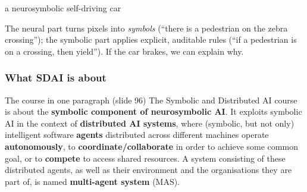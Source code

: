\begin{nbexample}{a neurosymbolic self-driving car}
\notinslides
\begin{center}
\end{center}
The neural part turns pixels into \emph{symbols} (``there is a pedestrian on the zebra
crossing''); the symbolic part applies explicit, auditable rules
(``if a pedestrian is on a crossing, then yield''). If the car brakes, we can explain why.
\end{nbexample}

\subsubsection{What SDAI is about}

\begin{nbfact}{The course in one paragraph (slide 96)}
The Symbolic and Distributed AI course is about the \textbf{symbolic component of
neurosymbolic AI}. It exploits symbolic AI in the context of \textbf{distributed AI
systems}, where (symbolic, but not only) intelligent software \textbf{agents} distributed
across different machines operate \textbf{autonomously}, to \textbf{coordinate/collaborate}
in order to achieve some common goal, or to \textbf{compete} to access shared resources. A
system consisting of these distributed agents, as well as their environment and the
organisations they are part of, is named \textbf{multi-agent system} (MAS).
\end{nbfact}

